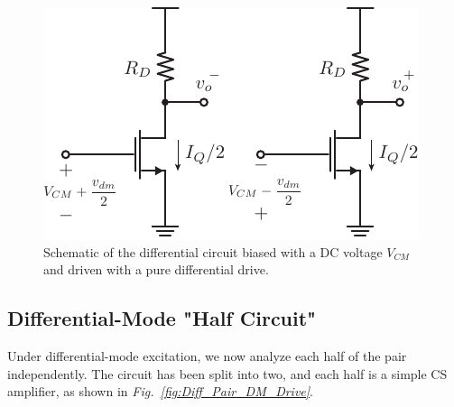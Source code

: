 \begin{figure}[H]
\centering
\includegraphics[scale=1.35]{Diff_ss_gain}
\caption{Schematic of the differential circuit biased with a DC voltage $V_{CM}$ and driven with a pure differential drive.}
\label{fig:Diff_ss_gain}
\end{figure}
\subsection{Differential-Mode "Half Circuit"}
Under differential-mode excitation, we now analyze each half of the pair independently.  The circuit has been split into two, and each half is a simple CS amplifier, as shown in \emph{Fig.~\ref{fig:Diff_Pair_DM_Drive}}.

